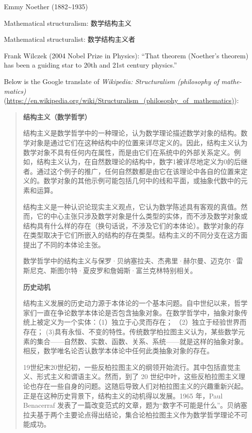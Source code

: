 Emmy Noether (1882\textasciitilde1935)

Mathematical structuralism: 数学结构主义

Mathematical structuralist: 数学结构主义者

Frank Wilczek (2004 Nobel Prize in Physics): ``That theorem (Noether's \newline
theorem) has been a guiding star to 20th and 21st century physics.''

Below is the Google translate of \textit{Wikipedia: Structuralism (philosophy of mathe- \newline matics)} (\url{https://en.wikipedia.org/wiki/Structuralism_(philosophy_of_mathematics)}):

\begin{quote}
\textbf{结构主义（数学哲学）}

结构主义是数学哲学中的一种理论，认为数学理论描述数学对象的结构。数学对象是通过它们在这种结构中的位置来详尽定义的。因此，结构主义认为数学对象不具有任何内在属性，而是由它们在系统中的外部关系定义。例如，结构主义认为，在自然数理论的结构中，数字1被详尽地定义为0的后继者。通过这个例子的推广，任何自然数都是由它在该理论中各自的位置来定义的。数学对象的其他示例可能包括几何中的线和平面，或抽象代数中的元素和运算。

结构主义是一种认识论现实主义观点，它认为数学陈述具有客观的真值。然而，它的中心主张只涉及数学对象是什么类型的实体，而不涉及数学对象或结构具有什么样的存在（换句话说，不涉及它们的本体论）。数学对象的存在类型取决于它们所嵌入的结构的存在类型。结构主义的不同分支在这方面提出了不同的本体论主张。

数学哲学中的结构主义与保罗·贝纳塞拉夫、杰弗里·赫尔曼、迈克尔·雷斯尼克、斯图尔特·夏皮罗和詹姆斯·富兰克林特别相关。

\textbf{历史动机}

结构主义发展的历史动力源于本体论的一个基本问题。自中世纪以来，哲学家们一直在争论数学本体论是否包含抽象对象。在数学哲学中，抽象对象传统上被定义为一个实体：（1）独立于心灵而存在；
（2）独立于经验世界而存在；
(3)具有永恒、不变的特性。传统数学柏拉图主义认为，某些数学元素的集合------自然数、实数、函数、关系、系统------就是这样的抽象对象。相反，数学唯名论否认数学本体论中任何此类抽象对象的存在。

19世纪末20世纪初，一些反柏拉图主义的纲领开始流行。其中包括直觉主义、形式主义和谓语主义。然而，到了
20
世纪中叶，这些反柏拉图主义理论也存在一些自身的问题。这随后导致人们对柏拉图主义的兴趣重新兴起。正是在这种历史背景下，结构主义的动机得以发展。1965
年，Paul Benacerraf
发表了一篇改变范式的文章，题为``数字不可能是什么''。贝纳塞拉夫基于两个主要论点得出结论，集合论柏拉图主义作为数学哲学理论不可能成功。


\end{quote}
